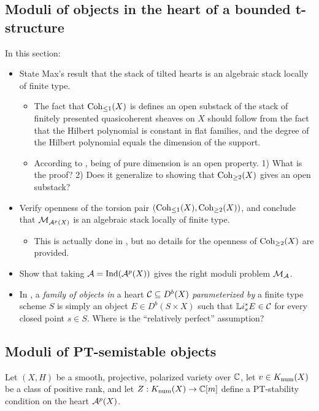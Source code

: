 \subsection{Moduli of objects in the heart of a bounded t-structure} 
In this section:
\begin{itemize}
    \item State Max's result that the stack of tilted hearts is an algebraic stack locally of finite type.
    \begin{itemize}
        \item The fact that $\operatorname{\mathrm{Coh}}_{\le 1}(X)$ is defines an open substack of the stack of finitely presented quasicoherent sheaves on $X$ should follow from the fact that the Hilbert polynomial is constant in flat families, and the degree of the Hilbert polynomial equals the dimension of the support.
        \item According to \cite[page 36]{HL}, being of pure dimension is an open property. 1) What is the proof? 2) Does it generalize to showing that $\operatorname{\mathrm{Coh}}_{\ge 2}(X)$ gives an open substack?
    \end{itemize}
    \item Verify openness of the torsion pair $(\operatorname{\mathrm{Coh}}_{\le 1}(X), \operatorname{\mathrm{Coh}}_{\ge 2}(X))$, and conclude that $\mathcal{M}_{\mathcal{A}^p(X)}$ is an algebraic stack locally of finite type.
    \begin{itemize}
        \item This is actually done in \cite[Lemma 3.14]{toda-limitstable}, but no details for the openness of $\operatorname{\mathrm{Coh}}_{\ge 2}(X)$ are provided.
    \end{itemize}
    \item Show that taking $\mathcal{A} = \operatorname{\mathrm{Ind}}(\mathcal{A}^p(X))$ gives the right moduli problem $\mathcal{M}_{\mathcal{A}}$.
    \item In \cite{AP06}, a \textit{family of objects in } a heart $\mathcal{C} \subseteq D^b(X)$ \textit{parameterized by} a finite type scheme $S$ is simply an object $E \in D^b(S \times X)$ such that $\mathbb{L} i^*_s E \in \mathcal{C}$ for every closed point $s \in S$. Where is the ``relatively perfect'' assumption?
\end{itemize}

\subsection{Moduli of PT-semistable objects}
Let $(X, H)$ be a smooth, projective, polarized variety over $\mathbb{C}$, let $v \in K_{\mathrm{num}}(X)$ be a class of positive rank, and let $Z: K_{\mathrm{num}}(X) \to \mathbb{C}[m]$ define a PT-stability condition on the heart $\mathcal{A}^p(X)$.

